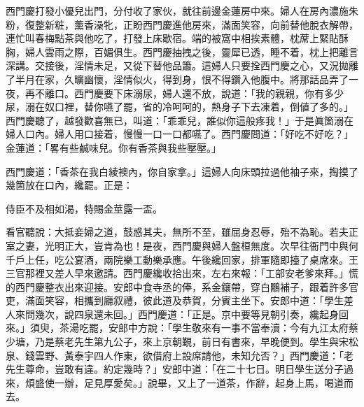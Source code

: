 西門慶打發小優兒出門，分付收了家伙，就往前邊金蓮房中來。婦人在房內濃施朱粉，復整新粧，薰香澡牝，正盼西門慶進他房來，滿面笑容，向前替他脫衣解帶，連忙叫春梅點茶與他吃了，打發上床歇宿。端的被窩中相挨素體，枕蓆上緊貼酥胸，婦人雲雨之際，百媚俱生。西門慶抽拽之後，靈犀已透，睡不着，枕上把離言深講。交接後，淫情未足，又從下替他品簫。這婦人只要拴西門慶之心，又況拋離了半月在家，久曠幽懷，淫情似火，得到身，恨不得鑽入他腹中。將那話品弄了一夜，再不離口。西門慶要下床溺尿，婦人還不放，說道：「我的親親，你有多少尿，溺在奴口裡，替你嚥了罷，省的冷呵呵的，熱身子下去凍着，倒値了多的。」{}西門慶聽了，越發歡喜無已，叫道：「乖乖兒，誰似你這般疼我！」于是眞箇溺在婦人口內。婦人用口接着，慢慢一口一口都嚥了。西門慶問道：「好吃不好吃？」{}金蓮道：「畧有些鹹味兒。{}你有香茶與我些壓壓。」

西門慶道：「香茶在我白綾襖內，你自家拿。」這婦人向床頭拉過他袖子來，掏摸了幾箇放在口內，纔罷。正是：

\begin{myquote}
侍臣不及相如渴，特賜金莖露一盃。
\end{myquote}

看官聽說：大抵妾婦之道，鼓惑其夫，無所不至，雖屈身忍辱，殆不為恥。若夫正室之妻，光明正大，豈肯為也！是夜，西門慶與婦人盤桓無度。次早往衙門中與何千戶上任，吃公宴酒，兩院樂工動樂承應。午後纔回家，排軍隨即擡了桌席來。王三官那裡又差人早來邀請。西門慶纔收拾出來，左右來報：「工部安老爹來拜。」慌的西門慶整衣出來迎接。安郎中食寺丞的俸，系金鑲帶，穿白鷳補子，跟着許多官吏，滿面笑容，相攜到廳叙禮，彼此道及恭賀，分賓主坐下。安郎中道：「學生差人來問幾次，說四泉還未回。」西門慶道：「正是。京中要等見朝引奏，纔起身回來。」須臾，茶湯吃罷，安郎中方說：「學生敬來有一事不當奉瀆：今有九江太府蔡少塘，乃是蔡老先生第九公子，來上京朝覲，前日有書來，早晚便到。學生與宋松泉、錢雲野、黃泰宇四人作東，欲借府上設席請他，未知允否？」西門慶道：「老先生尊命，豈敢有違。約定幾時？」安郎中道：「在二十七日。明日學生送分子過來，煩盛使一辦，足見厚愛矣。」說畢，又上了一道茶，作辭，起身上馬，喝道而去。

